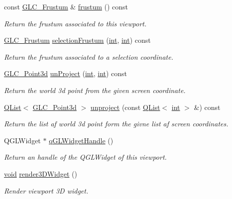 \begin{DoxyCompactItemize}
const \hyperlink{class_g_l_c___frustum}{G\-L\-C\-\_\-\-Frustum} \& \hyperlink{class_g_l_c___viewport_ab43f061cf408c483182d1e2d477f9e2d}{frustum} () const 
\begin{DoxyCompactList}\small\item\em Return the frustum associated to this viewport. \end{DoxyCompactList}\item 
\hyperlink{class_g_l_c___frustum}{G\-L\-C\-\_\-\-Frustum} \hyperlink{class_g_l_c___viewport_ab0a24a3af81ca32ab64945d95b40336f}{selection\-Frustum} (\hyperlink{ioapi_8h_a787fa3cf048117ba7123753c1e74fcd6}{int}, \hyperlink{ioapi_8h_a787fa3cf048117ba7123753c1e74fcd6}{int}) const 
\begin{DoxyCompactList}\small\item\em Return the frustum associated to a selection coordinate. \end{DoxyCompactList}\item 
\hyperlink{glc__vector3d_8h_a4e13a9bbc7ab3d34de7e98b41836772c}{G\-L\-C\-\_\-\-Point3d} \hyperlink{class_g_l_c___viewport_a2fb55e2669c9bef70247fefaa8791894}{un\-Project} (\hyperlink{ioapi_8h_a787fa3cf048117ba7123753c1e74fcd6}{int}, \hyperlink{ioapi_8h_a787fa3cf048117ba7123753c1e74fcd6}{int}) const 
\begin{DoxyCompactList}\small\item\em Return the world 3d point from the given screen coordinate. \end{DoxyCompactList}\item 
\hyperlink{class_q_list}{Q\-List}$<$ \hyperlink{glc__vector3d_8h_a4e13a9bbc7ab3d34de7e98b41836772c}{G\-L\-C\-\_\-\-Point3d} $>$ \hyperlink{class_g_l_c___viewport_a60071b3231d2c342b37957fb50526819}{unproject} (const \hyperlink{class_q_list}{Q\-List}$<$ \hyperlink{ioapi_8h_a787fa3cf048117ba7123753c1e74fcd6}{int} $>$ \&) const 
\begin{DoxyCompactList}\small\item\em Return the list af world 3d point form the givne list af screen coordinates. \end{DoxyCompactList}\item 
Q\-G\-L\-Widget $\ast$ \hyperlink{class_g_l_c___viewport_ad6dfe4ab6f599f134625b3a9bf06ea27}{q\-G\-L\-Widget\-Handle} ()
\begin{DoxyCompactList}\small\item\em Return an handle of the Q\-G\-L\-Widget of this viewport. \end{DoxyCompactList}\item 
\hyperlink{group___u_a_v_objects_plugin_ga444cf2ff3f0ecbe028adce838d373f5c}{void} \hyperlink{class_g_l_c___viewport_a906369354893fa7446f3d471a8f9fbc5}{render3\-D\-Widget} ()
\begin{DoxyCompactList}\small\item\em Render viewport 3\-D widget. \end{DoxyCompactList}\end{DoxyCompactItemize}


